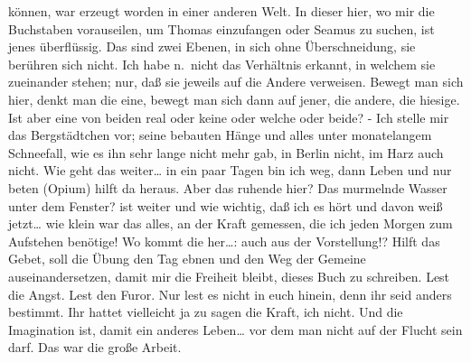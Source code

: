 \documentclass[
]{article}
\begin{document}
können, war erzeugt worden in einer anderen Welt. In dieser hier, wo mir
die Buchstaben vorauseilen, um Thomas einzufangen oder Seamus zu suchen,
ist jenes überflüssig. Das sind zwei Ebenen, in sich ohne
Überschneidung, sie berühren sich nicht. Ich habe n.~nicht das
Verhältnis erkannt, in welchem sie zueinander stehen; nur, daß sie
jeweils auf die Andere verweisen. Bewegt man sich hier, denkt man die
eine, bewegt man sich dann auf jener, die andere, die hiesige. Ist aber
eine von beiden real oder keine oder welche oder beide? - Ich stelle mir
das Bergstädtchen vor; seine bebauten Hänge und alles unter monatelangem
Schneefall, wie es ihn sehr lange nicht mehr gab, in Berlin nicht, im
Harz auch nicht. Wie geht das weiter\ldots{} in ein paar Tagen bin ich
weg, dann Leben und nur beten (Opium) hilft da heraus. Aber das ruhende
hier? Das murmelnde Wasser unter dem Fenster? ist weiter und wie
wichtig, daß ich es hört und davon weiß jetzt\ldots{} wie klein war das
alles, an der Kraft gemessen, die ich jeden Morgen zum Aufstehen
benötige! Wo kommt die her\ldots: auch aus der Vorstellung!? Hilft das
Gebet, soll die Übung den Tag ebnen und den Weg der Gemeine
auseinandersetzen, damit mir die Freiheit bleibt, dieses Buch zu
schreiben. Lest die Angst. Lest den Furor. Nur lest es nicht in euch
hinein, denn ihr seid anders bestimmt. Ihr hattet vielleicht ja zu sagen
die Kraft, ich nicht. Und die Imagination ist, damit ein anderes
Leben\ldots{} vor dem man nicht auf der Flucht sein darf. Das war die
große Arbeit.
\end{document}
